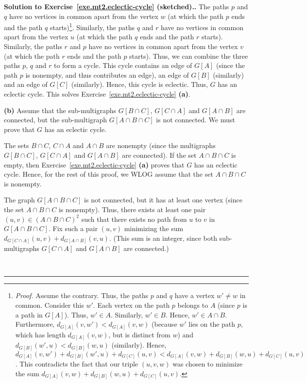 \documentclass[numbers=enddot,12pt,final,onecolumn,notitlepage]{scrartcl}%
\theoremstyle{definition}
\newenvironment{proof}[1][Proof]{\noindent\textbf{#1.} }{\ \rule{0.5em}{0.5em}}
\newcommand{\tup}[1]{\left( #1 \right)}
\newcommand{\ive}[1]{\left[ #1 \right]}
\begin{document}
\begin{proof}[Solution to Exercise~\ref{exe.mt2.eclectic-cycle}
(sketched).]
The paths $p$ and $q$ have no vertices in common apart from the
vertex $w$ (at which the path $p$ ends and the path $q$
starts)\footnote{\textit{Proof.} Assume the contrary.
  Thus, the paths $p$ and $q$ have a vertex $w' \neq w$ in common.
  Consider this $w'$.
  Each vertex on the path $p$ belongs to $A$ (since $p$ is a path in
  $G \ive{A}$). Thus, $w' \in A$. Similarly, $w' \in B$.
  Hence, $w' \in A \cap B$.
  Furthermore, $d_{G \ive{A}} \tup{v, w'} < d_{G \ive{A}} \tup{v, w}$
  (because $w'$ lies on the path $p$, which has length
  $d_{G \ive{A}} \tup{v, w}$, but is distinct from $w$) and
  $d_{G \ive{B}} \tup{w', u} < d_{G \ive{B}} \tup{w, u}$
  (similarly).
  Hence,
  $d_{G \ive{A}} \tup{v, w'} + d_{G \ive{B}} \tup{w', u}
   + d_{G \ive{C}} \tup{u, v}
  < d_{G \ive{A}} \tup{v, w} + d_{G \ive{B}} \tup{w, u}
   + d_{G \ive{C}} \tup{u, v}$.
  This contradicts the fact that our triple $\tup{u, v, w}$ was
  chosen to minimize the sum
  $d_{G \ive{A}} \tup{v, w} + d_{G \ive{B}} \tup{w, u}
   + d_{G \ive{C}} \tup{u, v}$.}.
Similarly, the paths $q$ and $r$ have no vertices in common apart from
the vertex $u$ (at which the path $q$ ends and the path $r$ starts).
Similarly, the paths $r$ and $p$ have no vertices in common apart from
the vertex $v$ (at which the path $r$ ends and the path $p$ starts).
Thus, we can combine the three paths $p$, $q$ and $r$ to form a cycle.
This cycle contains an edge of $G \ive{A}$ (since the path $p$ is
nonempty, and thus contributes an edge), an edge of $G \ive{B}$
(similarly) and an edge of $G \ive{C}$ (similarly).
Hence, this cycle is eclectic.
Thus, $G$ has an eclectic cycle.
This solves Exercise~\ref{exe.mt2.eclectic-cycle} \textbf{(a)}.

\textbf{(b)} Assume that the sub-multigraphs $G \ive{B \cap C}$,
$G \ive{C \cap A}$ and $G \ive{A \cap B}$ are connected, but the
sub-multigraph $G \ive{A \cap B \cap C}$ is not connected.
We must prove that $G$ has an eclectic cycle.

The sets $B \cap C$, $C \cap A$ and $A \cap B$ are nonempty
(since the multigraphs $G \ive{B \cap C}$,
$G \ive{C \cap A}$ and $G \ive{A \cap B}$ are connected).
If the set $A \cap B \cap C$ is empty, then
Exercise~\ref{exe.mt2.eclectic-cycle} \textbf{(a)} proves that
$G$ has an eclectic cycle.
Hence, for the rest of this proof, we WLOG assume that the set
$A \cap B \cap C$ is nonempty.

The graph $G \ive{A \cap B \cap C}$ is not connected, but it has at
least one vertex (since the set $A \cap B \cap C$ is nonempty).
Thus, there exists at least one pair
$\tup{u, v} \in \tup{A \cap B \cap C}^2$ such that there exists no
path from $u$ to $v$ in $G \ive{A \cap B \cap C}$.
Fix such a pair $\tup{u, v}$ minimizing the sum
$d_{G \ive{C \cap A}} \tup{u, v} + d_{G \ive{A \cap B}} \tup{v, u}$.
(This sum is an integer, since both sub-multigraphs $G \ive{C \cap A}$ and
$G \ive{A \cap B}$ are connected.)


\end{proof}
\end{document}

